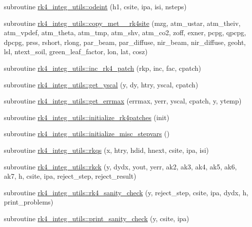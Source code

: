 \begin{DoxyCompactItemize}
\item 
subroutine \hyperlink{namespacerk4__integ__utils_a0b55d5d39c3cbc6daf331aeb11f91695}{rk4\+\_\+integ\+\_\+utils\+::odeint} (h1, csite, ipa, isi, nsteps)
\item 
subroutine \hyperlink{namespacerk4__integ__utils_a2509550e96da9c4a790d280d45f4864e}{rk4\+\_\+integ\+\_\+utils\+::copy\+\_\+met\+\_\+\_\+rk4site} (mzg, atm\+\_\+ustar, atm\+\_\+theiv, atm\+\_\+vpdef, atm\+\_\+theta, atm\+\_\+tmp, atm\+\_\+shv, atm\+\_\+co2, zoff, exner, pcpg, qpcpg, dpcpg, prss, rshort, rlong, par\+\_\+beam, par\+\_\+diffuse, nir\+\_\+beam, nir\+\_\+diffuse, geoht, lsl, ntext\+\_\+soil, green\+\_\+leaf\+\_\+factor, lon, lat, cosz)
\item 
subroutine \hyperlink{namespacerk4__integ__utils_a1b5e7645fe2cdb0b762d2cf3e31cf5d2}{rk4\+\_\+integ\+\_\+utils\+::inc\+\_\+rk4\+\_\+patch} (rkp, inc, fac, cpatch)
\item 
subroutine \hyperlink{namespacerk4__integ__utils_a86fecc945ec764cc4078e77b14cc4d7c}{rk4\+\_\+integ\+\_\+utils\+::get\+\_\+yscal} (y, dy, htry, yscal, cpatch)
\item 
subroutine \hyperlink{namespacerk4__integ__utils_a0d659f3ed9c7a38ec318bdc6928f0775}{rk4\+\_\+integ\+\_\+utils\+::get\+\_\+errmax} (errmax, yerr, yscal, cpatch, y, ytemp)
\item 
subroutine \hyperlink{namespacerk4__integ__utils_a4bfa1d47da43801294297d415bbef021}{rk4\+\_\+integ\+\_\+utils\+::initialize\+\_\+rk4patches} (init)
\item 
subroutine \hyperlink{namespacerk4__integ__utils_a0153c2edaad6ee0ff4cd412ed904a828}{rk4\+\_\+integ\+\_\+utils\+::initialize\+\_\+misc\+\_\+stepvars} ()
\item 
subroutine \hyperlink{namespacerk4__integ__utils_aef9b7042f99cf48874aa33a2fddda236}{rk4\+\_\+integ\+\_\+utils\+::rkqs} (x, htry, hdid, hnext, csite, ipa, isi)
\item 
subroutine \hyperlink{namespacerk4__integ__utils_a35bf6059115f1790f9a0ab993a6b4306}{rk4\+\_\+integ\+\_\+utils\+::rkck} (y, dydx, yout, yerr, ak2, ak3, ak4, ak5, ak6, ak7, h, csite, ipa, reject\+\_\+step, reject\+\_\+result)
\item 
subroutine \hyperlink{namespacerk4__integ__utils_a5c45094c8a9933867398c5cdab118803}{rk4\+\_\+integ\+\_\+utils\+::rk4\+\_\+sanity\+\_\+check} (y, reject\+\_\+step, csite, ipa, dydx, h, print\+\_\+problems)
\item 
subroutine \hyperlink{namespacerk4__integ__utils_acd2cfd872e82480579ab5b577df3cea9}{rk4\+\_\+integ\+\_\+utils\+::print\+\_\+sanity\+\_\+check} (y, csite, ipa)
\end{DoxyCompactItemize}
